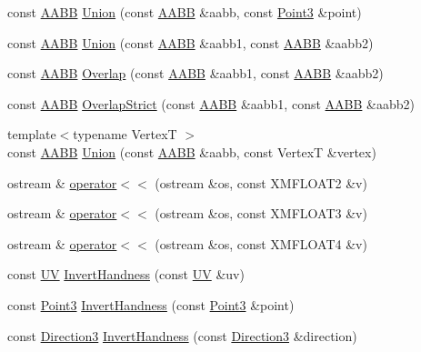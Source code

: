 \begin{DoxyCompactItemize}
\item 
const \hyperlink{structmage_1_1_a_a_b_b}{A\+A\+BB} \hyperlink{namespacemage_a4d27bf7b1b0d30b747cdec1326e80907}{Union} (const \hyperlink{structmage_1_1_a_a_b_b}{A\+A\+BB} \&aabb, const \hyperlink{structmage_1_1_point3}{Point3} \&point)
\item 
const \hyperlink{structmage_1_1_a_a_b_b}{A\+A\+BB} \hyperlink{namespacemage_a14f2c20e37511b983bcb731afbb6b0b6}{Union} (const \hyperlink{structmage_1_1_a_a_b_b}{A\+A\+BB} \&aabb1, const \hyperlink{structmage_1_1_a_a_b_b}{A\+A\+BB} \&aabb2)
\item 
const \hyperlink{structmage_1_1_a_a_b_b}{A\+A\+BB} \hyperlink{namespacemage_ade79a277862009e505ce6c15ecd98cdf}{Overlap} (const \hyperlink{structmage_1_1_a_a_b_b}{A\+A\+BB} \&aabb1, const \hyperlink{structmage_1_1_a_a_b_b}{A\+A\+BB} \&aabb2)
\item 
const \hyperlink{structmage_1_1_a_a_b_b}{A\+A\+BB} \hyperlink{namespacemage_a31fba0978e5da37928e5eec83a4f784d}{Overlap\+Strict} (const \hyperlink{structmage_1_1_a_a_b_b}{A\+A\+BB} \&aabb1, const \hyperlink{structmage_1_1_a_a_b_b}{A\+A\+BB} \&aabb2)
\item 
{\footnotesize template$<$typename VertexT $>$ }\\const \hyperlink{structmage_1_1_a_a_b_b}{A\+A\+BB} \hyperlink{namespacemage_aa727c025f86c9da2b6704c5f40b3d700}{Union} (const \hyperlink{structmage_1_1_a_a_b_b}{A\+A\+BB} \&aabb, const VertexT \&vertex)
\item 
ostream \& \hyperlink{namespacemage_ac348ad49bf7e9912aa70cda1b0ca553d}{operator$<$$<$} (ostream \&os, const X\+M\+F\+L\+O\+A\+T2 \&v)
\item 
ostream \& \hyperlink{namespacemage_a44b2d3046802608544402245919f219b}{operator$<$$<$} (ostream \&os, const X\+M\+F\+L\+O\+A\+T3 \&v)
\item 
ostream \& \hyperlink{namespacemage_af6c1d1c5718d611450932bde30d2bfef}{operator$<$$<$} (ostream \&os, const X\+M\+F\+L\+O\+A\+T4 \&v)
\item 
const \hyperlink{structmage_1_1_u_v}{UV} \hyperlink{namespacemage_ae12cd160f5bc01e4ef0aa2d45a80e14c}{Invert\+Handness} (const \hyperlink{structmage_1_1_u_v}{UV} \&uv)
\item 
const \hyperlink{structmage_1_1_point3}{Point3} \hyperlink{namespacemage_a909b2d7d07a296a41c320b8fe8ab1b82}{Invert\+Handness} (const \hyperlink{structmage_1_1_point3}{Point3} \&point)
\item 
const \hyperlink{structmage_1_1_direction3}{Direction3} \hyperlink{namespacemage_a6c9899cce1f1e4d70ad74f291314a90c}{Invert\+Handness} (const \hyperlink{structmage_1_1_direction3}{Direction3} \&direction)

\end{DoxyCompactItemize}

